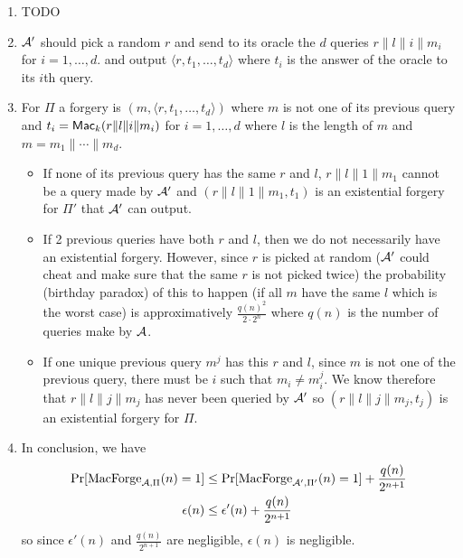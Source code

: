 \begin{solution}
  \begin{enumerate}
    \item TODO
    \item $\mathcal{A}'$ should pick a random $r$ and send to its oracle the $d$ queries $r\|l\|i\|m_i$ for $i = 1, \ldots, d$.
      and output $\langle r, t_1, \ldots, t_d \rangle$ where $t_i$ is the answer of the oracle to its $i$th query.
    \item For $\Pi$ a forgery is $(m, \langle r, t_1, \ldots, t_d \rangle)$ where $m$ is not one of its previous query
      and $t_i = \operatorname{\mathsf{Mac}}_k(r\|l\|i\|m_i)$ for $i = 1, \ldots, d$ where $l$ is the length of $m$ and $m = m_1\| \cdots \|m_d$.
      \begin{itemize}
        \item
          If none of its previous query has the same $r$ and $l$, $r\|l\|1\|m_1$ cannot be a query made by $\mathcal{A}'$ and
          $(r\|l\|1\|m_1, t_1)$ is an existential forgery for $\Pi'$ that $\mathcal{A}'$ can output.
        \item
          If 2 previous queries have both $r$ and $l$, then we do not necessarily have an existential forgery.
          However, since $r$ is picked at random ($\mathcal{A}'$ could cheat and make sure that the same $r$ is not picked twice)
          the probability (birthday paradox) of this to happen (if all $m$ have the same $l$ which is the worst case) is approximatively
          $\frac{q(n)^2}{2 \cdot 2^n}$ where $q(n)$ is the number of queries make by $\mathcal{A}$.
        \item
          If one unique previous query $m^j$ has this $r$ and $l$, since $m$ is not one of the previous query, there must be $i$
          such that $m_i \neq m_i^j$.
          We know therefore that $r\|l\|j\|m_j$ has never been queried by $\mathcal{A}'$ so $(r\|l\|j\|m_j, t_j)$ is an existential forgery for $\Pi$.
      \end{itemize}
    \item In conclusion, we have
      \begin{align*}
        \Pr[\operatorname{MacForge}_{\mathcal{A},\Pi}(n) = 1]
        & \leq \Pr[\operatorname{MacForge}_{\mathcal{A}',\Pi'}(n) = 1] + \frac{q(n)}{2^{n+1}}\\
        \epsilon(n)
        & \leq \epsilon'(n) + \frac{q(n)}{2^{n+1}}
      \end{align*}
      so since $\epsilon'(n)$ and $\frac{q(n)}{2^{n+1}}$ are negligible,
      $\epsilon(n)$ is negligible.
  \end{enumerate}
\end{solution}

